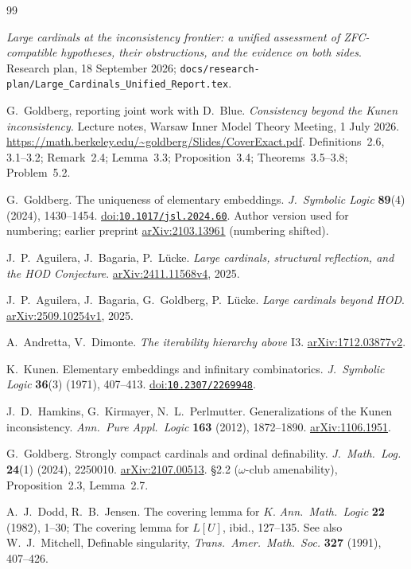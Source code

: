 \documentclass[11pt,letterpaper]{article}
\theoremstyle{definition}
\numberwithin{equation}{section}
\newcommand{\arxiv}[1]{\href{https://arxiv.org/abs/#1}{arXiv:#1}}
\newcommand{\doi}[1]{\href{https://doi.org/#1}{doi:\nolinkurl{#1}}}
\begin{document}
{}
\begin{thebibliography}{99}
\small
\setlength{\itemsep}{6pt}

\emph{Large cardinals at the inconsistency frontier: a unified assessment of ZFC-compatible hypotheses, their obstructions, and the evidence on both sides}. Research plan, 18 September 2026; \nolinkurl{docs/research-plan/Large_Cardinals_Unified_Report.tex}.

G.~Goldberg, reporting joint work with D.~Blue. \emph{Consistency beyond the Kunen inconsistency}. Lecture notes, Warsaw Inner Model Theory Meeting, 1 July 2026. \url{https://math.berkeley.edu/~goldberg/Slides/CoverExact.pdf}. Definitions~2.6, 3.1--3.2; Remark~2.4; Lemma~3.3; Proposition~3.4; Theorems~3.5--3.8; Problem~5.2.

G.~Goldberg. The uniqueness of elementary embeddings. \emph{J.\ Symbolic Logic} \textbf{89}(4) (2024), 1430--1454. \doi{10.1017/jsl.2024.60}. Author version used for numbering; earlier preprint \arxiv{2103.13961} (numbering shifted).

J.~P.~Aguilera, J.~Bagaria, P.~L\"ucke. \emph{Large cardinals, structural reflection, and the HOD Conjecture}. \arxiv{2411.11568v4}, 2025.

J.~P.~Aguilera, J.~Bagaria, G.~Goldberg, P.~L\"ucke. \emph{Large cardinals beyond HOD}. \arxiv{2509.10254v1}, 2025.

A.~Andretta, V.~Dimonte. \emph{The iterability hierarchy above $\mathrm{I3}$}. \arxiv{1712.03877v2}.

K.~Kunen. Elementary embeddings and infinitary combinatorics. \emph{J.\ Symbolic Logic} \textbf{36}(3) (1971), 407--413. \doi{10.2307/2269948}.

J.~D.~Hamkins, G.~Kirmayer, N.~L.~Perlmutter. Generalizations of the Kunen inconsistency. \emph{Ann.\ Pure Appl.\ Logic} \textbf{163} (2012), 1872--1890. \arxiv{1106.1951}.

G.~Goldberg. Strongly compact cardinals and ordinal definability. \emph{J.\ Math.\ Log.} \textbf{24}(1) (2024), 2250010. \arxiv{2107.00513}. \S2.2 ($\omega$-club amenability), Proposition~2.3, Lemma~2.7.

A.~J.~Dodd, R.~B.~Jensen. The covering lemma for $K$. \emph{Ann.\ Math.\ Logic} \textbf{22} (1982), 1--30; The covering lemma for $L[U]$, ibid., 127--135. See also W.~J.~Mitchell, Definable singularity, \emph{Trans.\ Amer.\ Math.\ Soc.} \textbf{327} (1991), 407--426.


\end{thebibliography}
\end{document}
